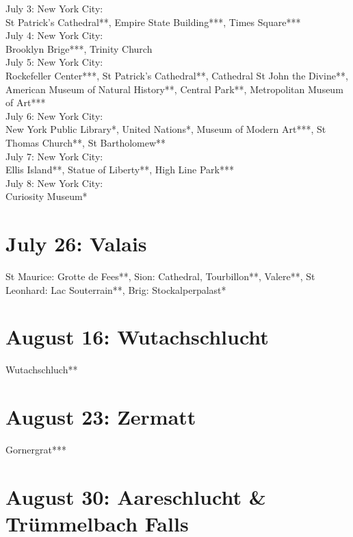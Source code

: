 July 3: New York City:\\
St Patrick's Cathedral**, Empire State Building***, Times Square***\\

July 4: New York City:\\
Brooklyn Brige***, Trinity Church\\

July 5: New York City:\\
Rockefeller Center***, St Patrick's Cathedral**, Cathedral St John the Divine**, American Museum of Natural History**, Central Park**, Metropolitan Museum of Art***\\

July 6: New York City:\\
New York Public Library*, United Nations*, Museum of Modern Art***, St Thomas Church**, St Bartholomew**\\

July 7: New York City:\\
Ellis Island**, Statue of Liberty**, High Line Park***\\

July 8: New York City:\\
Curiosity Museum*

\section{July 26: Valais}
\label{2009:Valais}

St Maurice: Grotte de Fees**, Sion: Cathedral, Tourbillon**, Valere**, St Leonhard: Lac Souterrain**, Brig: Stockalperpalast*

\section{August 16: Wutachschlucht}
\label{2009:Wutachschlucht}

Wutachschluch**

\section{August 23: Zermatt}
\label{2009:Zermatt}

Gornergrat***

\section{August 30: Aareschlucht \& Tr\"ummelbach Falls}
\label{2009:Aareschlucht}

